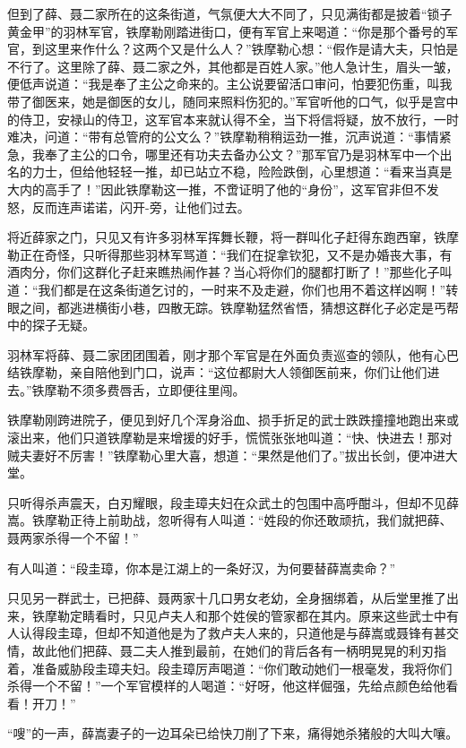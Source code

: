 \documentclass[12pt,oneside]{book}
\begin{document}
但到了薛、聂二家所在的这条街道，气氛便大大不同了，只见满街都是披着``锁子黄金甲''的羽林军官，铁摩勒刚踏进街口，便有军官上来喝道：``你是那个番号的军官，到这里来作什么？这两个又是什么人？''铁摩勒心想：``假作是请大夫，只怕是不行了。这里除了薛、聂二家之外，其他都是百姓人家。''他人急计生，眉头一皱，便低声说道：``我是奉了主公之命来的。主公说要留活口审问，怕要犯伤重，叫我带了御医来，她是御医的女儿，随同来照料伤犯的。''军官听他的口气，似乎是宫中的侍卫，安禄山的侍卫，这军官本来就认得不全，当下将信将疑，放不放行，一时难决，问道：``带有总管府的公文么？''铁摩勒稍稍运劲一推，沉声说道：``事情紧急，我奉了主公的口令，哪里还有功夫去备办公文？''那军官乃是羽林军中一个出名的力士，但给他轻轻一推，却已站立不稳，险险跌倒，心里想道：``看来当真是大内的高手了！''因此铁摩勒这一推，不啻证明了他的``身份''，这军官非但不发怒，反而连声诺诺，闪开-旁，让他们过去。

将近薛家之门，只见又有许多羽林军挥舞长鞭，将一群叫化子赶得东跑西窜，铁摩勒正在奇怪，只听得那些羽林军骂道：``我们在捉拿钦犯，又不是办婚丧大事，有酒肉分，你们这群化子赶来瞧热闹作甚？当心将你们的腿都打断了！''那些化子叫道：``我们都是在这条街道乞讨的，一时来不及走避，你们也用不着这样凶啊！''转眼之间，都逃进横街小巷，四散无踪。铁摩勒猛然省悟，猜想这群化子必定是丐帮中的探子无疑。

羽林军将薛、聂二家团团围着，刚才那个军官是在外面负责巡查的领队，他有心巴结铁摩勒，亲自陪他到门口，说声：``这位都尉大人领御医前来，你们让他们进去。''铁摩勒不须多费唇舌，立即便往里闯。

铁摩勒刚跨进院子，便见到好几个浑身浴血、损手折足的武士跌跌撞撞地跑出来或滚出来，他们只道铁摩勒是来增援的好手，慌慌张张地叫道：``快、快进去！那对贼夫妻好不厉害！''铁摩勒心里大喜，想道：``果然是他们了。''拔出长剑，便冲进大堂。

只听得杀声震天，白刃耀眼，段圭璋夫妇在众武土的包围中高呼酣斗，但却不见薛嵩。铁摩勒正待上前助战，忽听得有人叫道：``姓段的你还敢顽抗，我们就把薛、聂两家杀得一个不留！''

有人叫道：``段圭璋，你本是江湖上的一条好汉，为何要替薛嵩卖命？''

只见另一群武士，已把薛、聂两家十几口男女老幼，全身捆绑着，从后堂里推了出来，铁摩勒定睛看时，只见卢夫人和那个姓侯的管家都在其内。原来这些武士中有人认得段圭璋，但却不知道他是为了救卢夫人来的，只道他是与薛嵩或聂锋有甚交情，故此他们把薛、聂二夫人推到最前，在她们的背后各有一柄明晃晃的利刃指着，准备威胁段圭璋夫妇。段圭璋厉声喝道：``你们敢动她们一根毫发，我将你们杀得一个不留！''一个军官模样的人喝道：``好呀，他这样倔强，先给点颜色给他看看！开刀！''

``嗖''的一声，薛嵩妻子的一边耳朵已给快刀削了下来，痛得她杀猪般的大叫大嚷。
\end{document}
